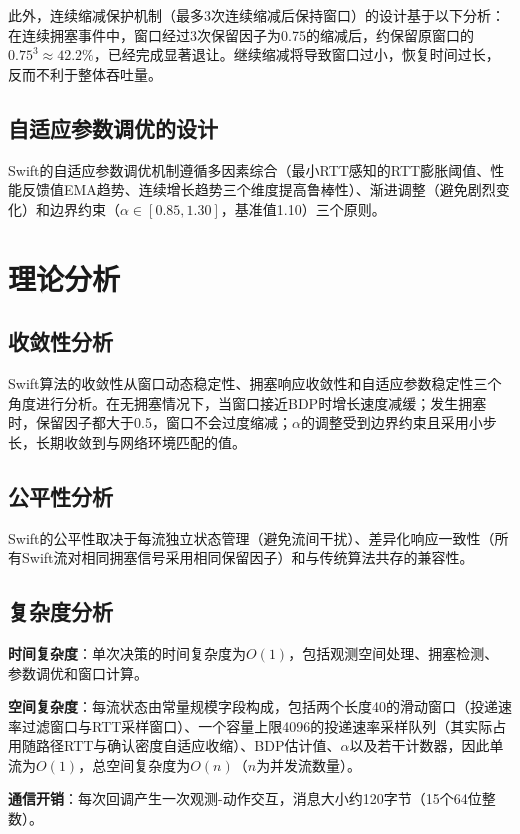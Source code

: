 此外，连续缩减保护机制（最多3次连续缩减后保持窗口）的设计基于以下分析：在连续拥塞事件中，窗口经过3次保留因子为0.75的缩减后，约保留原窗口的$0.75^3 \approx 42.2\%$，已经完成显著退让。继续缩减将导致窗口过小，恢复时间过长，反而不利于整体吞吐量。

\subsection{自适应参数调优的设计}

Swift的自适应参数调优机制遵循多因素综合（最小RTT感知的RTT膨胀阈值、性能反馈值EMA趋势、连续增长趋势三个维度提高鲁棒性）、渐进调整（避免剧烈变化）和边界约束（$\alpha \in [0.85, 1.30]$，基准值1.10）三个原则。

\section{理论分析}

\subsection{收敛性分析}

Swift算法的收敛性从窗口动态稳定性、拥塞响应收敛性和自适应参数稳定性三个角度进行分析。在无拥塞情况下，当窗口接近BDP时增长速度减缓；发生拥塞时，保留因子都大于0.5，窗口不会过度缩减；$\alpha$的调整受到边界约束且采用小步长，长期收敛到与网络环境匹配的值。

\subsection{公平性分析}

Swift的公平性取决于每流独立状态管理（避免流间干扰）、差异化响应一致性（所有Swift流对相同拥塞信号采用相同保留因子）和与传统算法共存的兼容性。

\subsection{复杂度分析}

\textbf{时间复杂度}：单次决策的时间复杂度为$O(1)$，包括观测空间处理、拥塞检测、参数调优和窗口计算。

\textbf{空间复杂度}：每流状态由常量规模字段构成，包括两个长度40的滑动窗口（投递速率过滤窗口与RTT采样窗口）、一个容量上限4096的投递速率采样队列（其实际占用随路径RTT与确认密度自适应收缩）、BDP估计值、$\alpha$以及若干计数器，因此单流为$O(1)$，总空间复杂度为$O(n)$（$n$为并发流数量）。

\textbf{通信开销}：每次回调产生一次观测-动作交互，消息大小约120字节（15个64位整数）。

